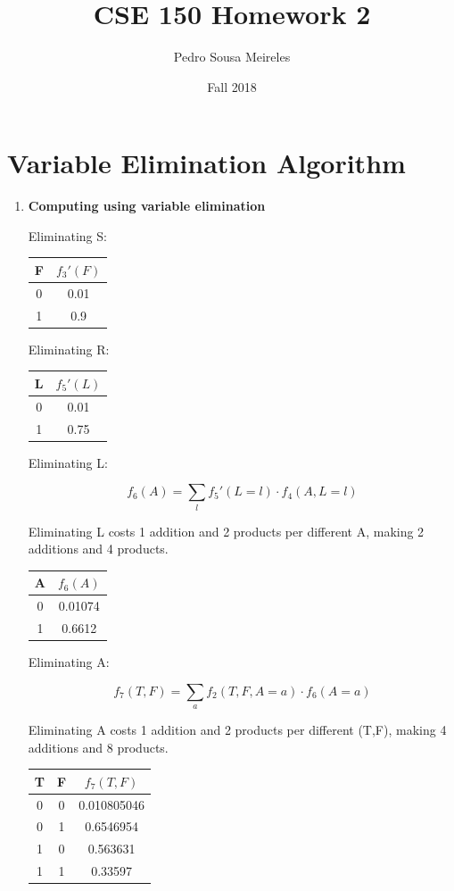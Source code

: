 \documentclass[11]{article}
\title{CSE 150 Homework 2}
\date{Fall 2018}
\author{Pedro Sousa Meireles}
\begin{document}
\maketitle
\section{Variable Elimination Algorithm}
\begin{enumerate}[label=(\alph*)]
\item{\textbf{Computing using variable elimination}}

Eliminating S:

\begin{table}[htp]
\centering
\begin{tabular}{c|c}
F & $f_3'(F)$ \\ \hline
0 & 0.01       \\ \hline
1 & 0.9       
\end{tabular}
\end{table}

Eliminating R:

\begin{table}[htp]
\centering
\begin{tabular}{c|c}
L & $f_5'(L)$ \\ \hline
0 & 0.01       \\ \hline
1 & 0.75      
\end{tabular}
\end{table}

Eliminating L:

$$f_6(A)=\sum_l f_5'(L=l) \cdot f_4(A,L=l)$$

Eliminating L costs 1 addition and 2 products per different A, making 2 additions and 4 products.

\begin{table}[htp]
\centering
\begin{tabular}{c|c}
A & $f_6(A)$   \\ \hline
0 & 0.01074 \\ \hline
1 & 0.6612 
\end{tabular}
\end{table}

Eliminating A:

$$f_7(T,F)=\sum_a f_2(T,F,A=a) \cdot f_6(A=a)$$

Eliminating A costs 1 addition and 2 products per different (T,F), making 4 additions and 8 products.

\begin{table}[htp]
\centering
\begin{tabular}{c|c|c}
T & F & $f_7(T,F)$  \\ \hline
0 & 0 & 0.010805046 \\ \hline
0 & 1 & 0.6546954   \\ \hline
1 & 0 & 0.563631    \\ \hline
1 & 1 & 0.33597    
\end{tabular}
\end{table}
\pagebreak


\end{enumerate}
\end{document}
